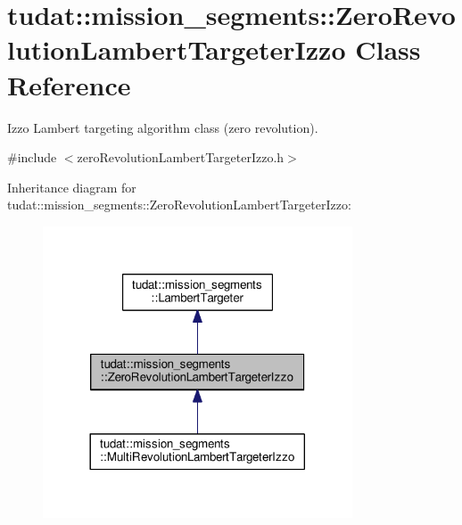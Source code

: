 \hypertarget{classtudat_1_1mission__segments_1_1ZeroRevolutionLambertTargeterIzzo}{}\section{tudat\+:\+:mission\+\_\+segments\+:\+:Zero\+Revolution\+Lambert\+Targeter\+Izzo Class Reference}
\label{classtudat_1_1mission__segments_1_1ZeroRevolutionLambertTargeterIzzo}


Izzo Lambert targeting algorithm class (zero revolution).  




{\ttfamily \#include $<$zero\+Revolution\+Lambert\+Targeter\+Izzo.\+h$>$}



Inheritance diagram for tudat\+:\+:mission\+\_\+segments\+:\+:Zero\+Revolution\+Lambert\+Targeter\+Izzo\+:
\nopagebreak
\begin{figure}[H]
\begin{center}
\leavevmode
\includegraphics[width=260pt]{classtudat_1_1mission__segments_1_1ZeroRevolutionLambertTargeterIzzo__inherit__graph}
\end{center}
\end{figure}



